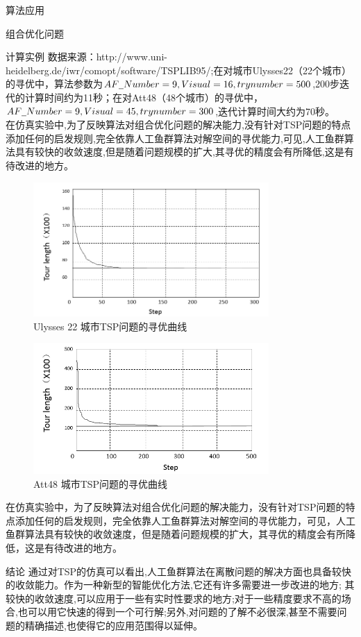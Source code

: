 \documentclass[UTF8]{ctexart}
\begin{document}
\begin{section}{算法应用}
\begin{subsection}{组合优化问题}
\begin{subsubsection}{计算实例}
数据来源：http://www.uni-heidelberg.de/iwr/comopt/software/TSPLIB95/;在对城市Ulysses22（22个城市）的寻优中，算法参数为$AF\underline{\hspace{0.5em}}Number=9, Visual=16,trynumber=500$,200步迭代的计算时间约为11秒；在对Att48（48个城市）的寻优中，$AF\underline{\hspace{0.5em}}Number=9, Visual=45, trynumber=300$,迭代计算时间大约为70秒。\\
在仿真实验中,为了反映算法对组合优化问题的解决能力,没有针对TSP问题的特点添加任何的启发规则,完全依靠人工鱼群算法对解空间的寻优能力,可见,人工鱼群算法具有较快的收敛速度,但是随着问题规模的扩大,其寻优的精度会有所降低,这是有待改进的地方。
\begin{figure}[H]
\centering
\includegraphics[width=0.8\textwidth]{../../pic/fish4.png}
\caption{Ulysses 22 城市TSP问题的寻优曲线}
\end{figure}
\begin{figure}[htbp]
\centering
\includegraphics[width=0.8\textwidth]{../../pic/fish5.png}
\caption{Att48 城市TSP问题的寻优曲线}
\end{figure}
在仿真实验中，为了反映算法对组合优化问题的解决能力，没有针对TSP问题的特点添加任何的启发规则，完全依靠人工鱼群算法对解空间的寻优能力，可见，人工鱼群算法具有较快的收敛速度，但是随着问题规模的扩大，其寻优的精度会有所降低，这是有待改进的地方。
\end{subsubsection}
\begin{subsubsection}{结论}
通过对TSP的仿真可以看出,人工鱼群算法在离散问题的解决方面也具备较快的收敛能力。作为一种新型的智能优化方法,它还有许多需要进一步改进的地方;
其较快的收敛速度,可以应用于一些有实时性要求的地方;对于一些精度要求不高的场合,也可以用它快速的得到一个可行解;另外,对问题的了解不必很深,甚至不需要问题的精确描述,也使得它的应用范围得以延伸。


\end{subsubsection}
\end{subsection}
\end{section}
\end{document}
